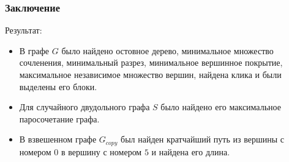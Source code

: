 \documentclass[c]{beamer}  %
\begin{document}
 \begin{frame}
\frametitle{Заключение}
\begin{block}{Результат:} 
\begin{itemize}
\footnotesize
    \item В графе $G$ было найдено остовное дерево, минимальное множество сочленения, минимальный разрез, минимальное вершинное покрытие, максимальное независимое множество вершин, найдена клика и были выделены его блоки.

    \item Для случайного двудольного графа $S$ было найдено его максимальное паросочетание графа.

    \item В взвешенном графе $G_{copy}$ был найден кратчайший путь из вершины с номером $0$ в вершину с номером $5$ и найдена его длина.

\end{itemize}	
\end{block}
 \end{frame}
\end{document}
